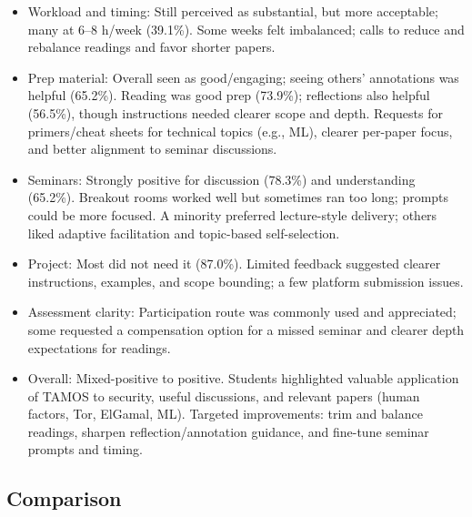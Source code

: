 \documentclass[a4paper]{report}
\begin{document}
\begin{itemize}
  \item Workload and timing: Still perceived as substantial, but more acceptable; many at 6–8 h/week (39.1\%). Some weeks felt imbalanced; calls to reduce and rebalance readings and favor shorter papers.
  \item Prep material: Overall seen as good/engaging; seeing others’ annotations was helpful (65.2\%). Reading was good prep (73.9\%); reflections also helpful (56.5\%), though instructions needed clearer scope and depth. Requests for primers/cheat sheets for technical topics (e.g., ML), clearer per-paper focus, and better alignment to seminar discussions.
  \item Seminars: Strongly positive for discussion (78.3\%) and understanding (65.2\%). Breakout rooms worked well but sometimes ran too long; prompts could be more focused. A minority preferred lecture-style delivery; others liked adaptive facilitation and topic-based self-selection.
  \item Project: Most did not need it (87.0\%). Limited feedback suggested clearer instructions, examples, and scope bounding; a few platform submission issues.
  \item Assessment clarity: Participation route was commonly used and appreciated; some requested a compensation option for a missed seminar and clearer depth expectations for readings.
  \item Overall: Mixed-positive to positive. Students highlighted valuable application of TAMOS to security, useful discussions, and relevant papers (human factors, Tor, ElGamal, ML). Targeted improvements: trim and balance readings, sharpen reflection/annotation guidance, and fine-tune seminar prompts and timing.
\end{itemize}

\subsection*{Comparison}
\end{document}
